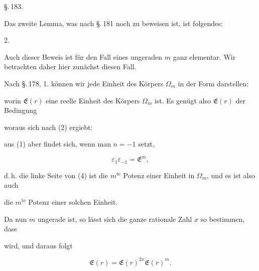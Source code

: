 

\begin{center}
\S.\,183.

\end{center}

Das zweite Lemma, was nach \S.\,181 noch zu beweisen ist, ist
folgendes:

2. 



Auch dieser Beweis ist f\"ur den Fall eines ungeraden $m$ ganz
elementar. Wir betrachten daher hier zun\"achst diesen Fall.

Nach \S.\,178, 1. k\"onnen wir jede Einheit des K\"orpers $\Omega_m$
in der Form darstellen:


worin $\mathfrak{E}(r)$ eine reelle Einheit des K\"orpers $\Omega_m$
ist. Es gen\"ugt also $\mathfrak{E}(r)$ der Bedingung


woraus sich nach (2) ergiebt:


aus (1) aber findet sich, wenn man $n = -1$ setzt,

\[
\varepsilon_1 \varepsilon_{-1} = \mathfrak{E}^m,
\]

d.\,h. die linke Seite von (4) ist die $m^{\text{te}}$ Potenz einer
Einheit in $\Omega_m$, und es ist also auch


die $m^{\text{te}}$ Potenz einer solchen Einheit.

Da nun $m$ ungerade ist, so l\"asst sich die ganze rationale Zahl $x$
so bestimmen, dass


wird, und daraus folgt

\[
\mathfrak{E}(r) = \mathfrak{E}(r)^{2x} \mathfrak{E}(r)^m.
\]
